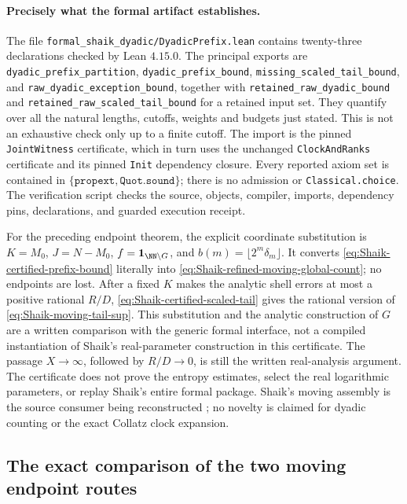 \paragraph{Precisely what the formal artifact establishes.}
The file \texttt{formal\_shaik\_dyadic/DyadicPrefix.lean} contains
twenty-three declarations checked by Lean \(4.15.0\).
The principal exports are
\texttt{dyadic\_prefix\_partition},
\texttt{dyadic\_prefix\_bound},
\texttt{missing\_scaled\_tail\_bound}, and
\texttt{raw\_dyadic\_exception\_bound}, together with
\texttt{retained\_raw\_dyadic\_bound} and
\texttt{retained\_raw\_scaled\_tail\_bound} for a retained input set.
They quantify over all the natural lengths, cutoffs, weights and budgets
just stated. This is not an exhaustive check only up to a finite cutoff.
The import is the pinned \texttt{JointWitness} certificate, which in turn
uses the unchanged \texttt{ClockAndRanks} certificate and its pinned
\texttt{Init} dependency closure. Every reported axiom set is contained in
\(\{\texttt{propext},\texttt{Quot.sound}\}\); there is no admission
or \texttt{Classical.choice}. The verification script checks the source,
objects, compiler, imports, dependency pins, declarations, and guarded
execution receipt.

For the preceding endpoint theorem, the explicit coordinate substitution
is \(K=M_0\), \(J=N-M_0\),
\(f=\boldsymbol1_{\NN\setminus G}\), and
\(b(m)=\lfloor2^m\delta_m\rfloor\). It converts
\eqref{eq:Shaik-certified-prefix-bound} literally into
\eqref{eq:Shaik-refined-moving-global-count}; no endpoints are lost.
After a fixed \(K\) makes the analytic shell errors at most a positive
rational \(R/D\), \eqref{eq:Shaik-certified-scaled-tail} gives the
rational version of \eqref{eq:Shaik-moving-tail-sup}.
This substitution and the analytic construction of \(G\) are a written
comparison with the generic formal interface, not a compiled instantiation
of Shaik's real-parameter construction in this certificate.
The passage \(X\to\infty\), followed by \(R/D\to0\), is still the written
real-analysis argument. The certificate does not prove the entropy
estimates, select the real logarithmic parameters, or replay Shaik's
entire formal package. Shaik's moving assembly is the source consumer
being reconstructed \cite{Shaik2026v324}; no novelty is claimed for
dyadic counting or the exact Collatz clock expansion.

\subsection{The exact comparison of the two moving endpoint routes}

